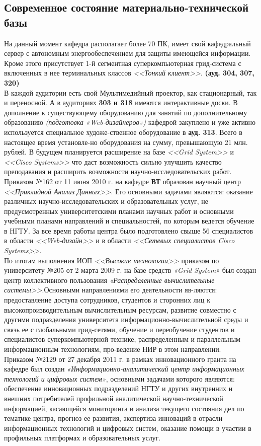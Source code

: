 \documentclass[12pt,a4paper]{article}
\begin{document}
\begin{flushleft}
\subsection{Современное состояние материально-технической базы}
\begin{flushleft}
\large
На данный момент кафедра располагает более 70 ПК, имеет свой кафедральный сервер с автономным энергообеспечением для защиты имеющейся информации. Кроме этого присутствует 1-й сегментная суперкомпьютерная грид-система с включенных в нее терминальных классов \emph{<<Тонкий клиент>>}. \textbf{(ауд. 304, 307, 320)}
\\
В каждой аудитории есть свой Мультимедийный проектор, как стационарный, так и переносной. А в аудиториях \textbf{303 и 318} имеются интерактивные доски. В дополнение к существующему оборудованию для занятий по дополнительному образованию \emph{(подготовка «Web-дизайнеров»)} кафедрой закуплено и уже активно используется специальное художе-ственное оборудование в  \textbf{ауд. 313}. Всего в настоящее время установле-но оборудования на сумму, превышающую 21 млн. рублей. В будущем планируется расширение на базе \textit{<<Grid System>>} и \textit{<<Cisco Systems>>} что даст возможность сильно улучшить качество преподавания и расширить возможности научно-исследовательских работ.
\\
Приказом №162 от 11 июня 2010 г. на кафедре \textbf{ВТ} образован научный центр \textit{<<Прикладной Анализ Данных>>}. Его основными задачами являются: оказание различных научно-исследовательских и образовательных услуг, не предусмотренных университетскими планами научных работ и основными учебными планами направлений и специальностей, по которым ведется обучение в НГТУ. За все время работы центра было подготовлено свыше 56 специалистов в области \textit{<<Web-дизайн>>} и в области \textit{<<Сетевых специалистов Cisco Systems>>}.
\\
По итогам выполнения ИОП \textit{<<Высокие технологии>>} приказом по университету №205 от 2 марта 2009 г. на базе средств \textit{«Grid System»} был создан центр коллективного пользования \textit{«Распределенные вычислительные системы>>}.Основными направлениями его деятельности яв-ляются: предоставление доступа сотрудников, студентов и сторонних лиц к высокопроизводительным вычислительным ресурсам, развитие совместно с другими подразделения университета информационно-вычислительной среды и связь ее с глобальными грид-сетями, обучение и переобучение студентов и специалистов суперкомпьютерной технике, распределенным и параллельным информационным технологиям, про-ведение НИР в этом направлении.
\\
Приказом №2129 от 27 декабря 2011 г. в рамках инновационного гранта на кафедре был создан \textit{«Информационно-аналитический центр информационных технологий и цифровых систем»}, основными задачами которого являются: обеспечение инновационных подразделений НГТУ и других внутренних и внешних потребителей профильной аналитической научно-технической информацией, касающейся мониторинга и анализа текущего состояния дел по тематике центра, прогноз ее развития, экспертиза инноваций в отрасли информационных технологий и цифровых систем, оказание помощи в участии в профильных платформах и образовательных услуг.
\end{flushleft}

\end{flushleft}
\end{document}
